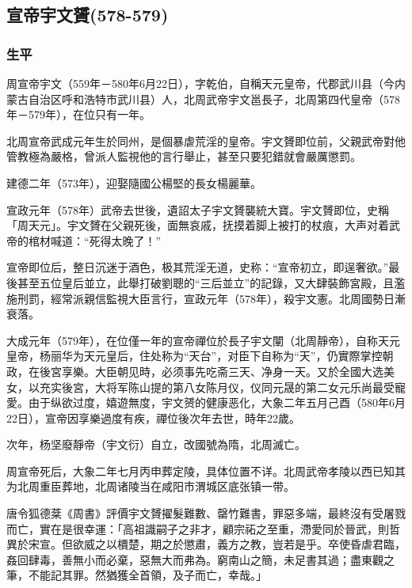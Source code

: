 
\subsection{宣帝宇文贇\tiny(578-579)}

\subsubsection{生平}

周宣帝宇文（559年－580年6月22日），字乾伯，自稱天元皇帝，代郡武川县（今内蒙古自治区呼和浩特市武川县）人，北周武帝宇文邕長子，北周第四代皇帝（578年－579年），在位只有一年。

北周宣帝武成元年生於同州，是個暴虐荒淫的皇帝。宇文贇即位前，父親武帝對他管教極為嚴格，曾派人監視他的言行舉止，甚至只要犯錯就會嚴厲懲罰。

建德二年（573年），迎娶隨國公楊堅的長女楊麗華。

宣政元年（578年）武帝去世後，遺詔太子宇文贇襲統大寶。宇文贇即位，史稱「周天元」。宇文贇在父親死後，面無哀戚，抚摸着脚上被打的杖痕，大声对着武帝的棺材喊道：“死得太晚了！”

宣帝即位后，整日沉迷于酒色，极其荒淫无道，史称：“宣帝初立，即逞奢欲。”最後甚至五位皇后並立，此舉打破劉聰的“三后並立”的記錄，又大肆裝飾宮殿，且濫施刑罰，經常派親信監視大臣言行，宣政元年（578年），殺宇文憲。北周國勢日漸衰落。

大成元年（579年），在位僅一年的宣帝禪位於長子宇文闡（北周靜帝），自称天元皇帝，杨丽华为天元皇后，住处称为“天台”，对臣下自称为“天”，仍實際掌控朝政，在後宮享樂。大臣朝见時，必须事先吃斋三天、净身一天。又於全國大选美女，以充实後宮，大将军陈山提的第八女陈月仪，仪同元晟的第二女元乐尚最受寵愛。由于纵欲过度，嬉遊無度，宇文赟的健康恶化，大象二年五月己酉（580年6月22日），宣帝因享樂過度有疾，禪位後次年去世，時年22歲。

次年，杨坚廢靜帝（宇文衍）自立，改國號為隋，北周滅亡。

周宣帝死后，大象二年七月丙申葬定陵，具体位置不详。北周武帝孝陵以西已知其为北周重臣葬地，北周诸陵当在咸阳市渭城区底张镇一带。

唐令狐德棻《周書》評價宇文贇擢髮難數、罄竹難書，罪惡多端，最終沒有受屠戮而亡，實在是很幸運：「高祖識嗣子之非才，顧宗祏之至重，滯愛同於晉武，則哲異於宋宣。但欲威之以檟楚，期之於懲肅，義方之教，豈若是乎。卒使昏虐君臨，姦回肆毒，善無小而必棄，惡無大而弗為。窮南山之簡，未足書其過；盡東觀之筆，不能記其罪。然猶獲全首領，及子而亡，幸哉。」


